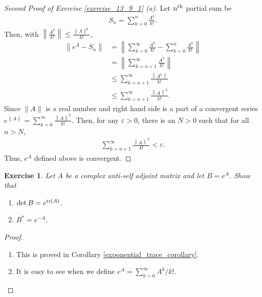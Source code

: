 \documentclass[11pt]{book}
\newtheorem{exercise}{Exercise}[section]
\theoremstyle{definition}
\numberwithin{equation}{chapter}
\begin{document}
\begin{proof}[Second Proof of Exercise \ref{exercise_13_9_1} (a)] \cite{42}
Let $n^{\rm th}$ partial sum be 
\begin{align*}
    S_n = \sum^n_{k=0} \frac{A^k}{k!}.
\end{align*}
Then, with $\left\| \frac{A^k}{k!} \right\| \leq \frac{\|A\|^k}{k!}$,
\begin{align*}
    \left\| e^A - S_n \right\| & = \left\| \sum^\infty_{k=0} \frac{A^k}{k!} - \sum^n_{k=0} \frac{A^k}{k!} \right\| \\
    & = \left\| \sum^\infty_{k=n+1} \frac{A^k}{k!} \right\| \\
    & \leq \sum^\infty_{k=n+1} \frac{\left\|A^k\right\|}{k!} \\
    & \leq \sum^\infty_{k=n+1} \frac{\left\|A\right\|^k}{k!}.
\end{align*}
Since $\|A\|$ is a real number and right hand side is a part of a convergent series $e^{\|A\|} = \sum^\infty_{k=0} \frac{\left\|A\right\|^k}{k!}$. Then, for any $\varepsilon > 0$, there is an $N > 0$ such that for all $n > N$,
\begin{align*}
    \sum^\infty_{k=n+1} \frac{\left\|A\right\|^k}{k!} < \varepsilon.
\end{align*}
Thus, $e^A$ defined above is convergent.
\end{proof}

\medskip

\begin{exercise}
Let $A$ be a complex anti-self adjoint matrix and let $B = e^A$. Show that
\begin{enumerate}[label=(\alph*)]
    \item $\det B = e^{\tr(A)}$.
    
    \item $B^* = e^{-A}$.
\end{enumerate}
\end{exercise}
\begin{proof}
~\begin{enumerate}[label=(\alph*)]
    \item This is proved in Corollary \ref{exponential_trace_corollary}.
    
    \item It is easy to see when we define $e^A = \sum^\infty_{k=0} A^k/k!$.
\end{enumerate}
\end{proof}

\medskip
\end{document}
